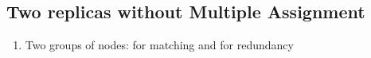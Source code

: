 \subsection{Two replicas without Multiple Assignment}\label{ap:tworep-ni}

\begin{enumerate}
  \item Two groups of nodes: for matching and for redundancy
\end{enumerate}